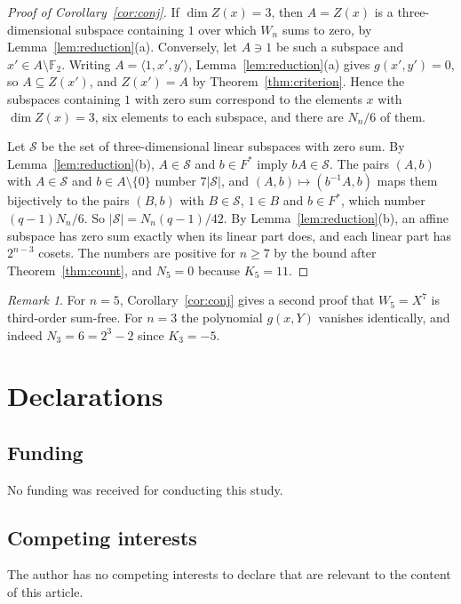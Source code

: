 \documentclass[11pt]{amsart}
\theoremstyle{definition}
\theoremstyle{remark}
\newtheorem{remark}[theorem]{Remark}
\numberwithin{equation}{section}
\newcommand{\F}{\mathbb{F}}
\begin{document}
\begin{proof}[Proof of Corollary~\ref{cor:conj}]
If $\dim Z(x)=3$, then $A=Z(x)$ is a three-dimensional subspace containing $1$ over which $W_n$ sums to zero, by Lemma~\ref{lem:reduction}(a). Conversely, let $A\ni1$ be such a subspace and $x'\in A\setminus\F_2$. Writing $A=\langle1,x',y'\rangle$, Lemma~\ref{lem:reduction}(a) gives $g(x',y')=0$, so $A\subseteq Z(x')$, and $Z(x')=A$ by Theorem~\ref{thm:criterion}. Hence the subspaces containing $1$ with zero sum correspond to the elements $x$ with $\dim Z(x)=3$, six elements to each subspace, and there are $N_n/6$ of them.

Let $\mathcal S$ be the set of three-dimensional linear subspaces with zero sum. By Lemma~\ref{lem:reduction}(b), $A\in\mathcal S$ and $b\in F^*$ imply $bA\in\mathcal S$. The pairs $(A,b)$ with $A\in\mathcal S$ and $b\in A\setminus\{0\}$ number $7|\mathcal S|$, and $(A,b)\mapsto(b^{-1}A,b)$ maps them bijectively to the pairs $(B,b)$ with $B\in\mathcal S$, $1\in B$ and $b\in F^*$, which number $(q-1)N_n/6$. So $|\mathcal S|=N_n(q-1)/42$. By Lemma~\ref{lem:reduction}(b), an affine subspace has zero sum exactly when its linear part does, and each linear part has $2^{n-3}$ cosets. The numbers are positive for $n\ge7$ by the bound after Theorem~\ref{thm:count}, and $N_5=0$ because $K_5=11$.
\end{proof}

\begin{remark}
For $n=5$, Corollary~\ref{cor:conj} gives a second proof that $W_5=X^7$ is third-order sum-free. For $n=3$ the polynomial $g(x,Y)$ vanishes identically, and indeed $N_3=6=2^3-2$ since $K_3=-5$.
\end{remark}

\section*{Declarations}

\subsection*{Funding} No funding was received for conducting this study.

\subsection*{Competing interests} The author has no competing interests to declare that are relevant to the content of this article.
\end{document}
